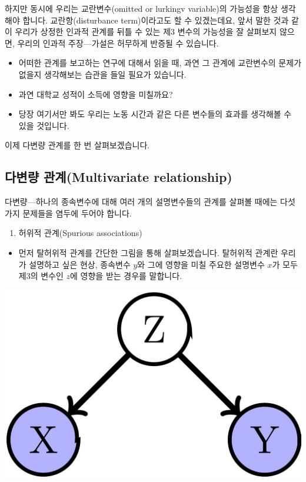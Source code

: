 \documentclass[]{book}
\providecommand{\tightlist}{%
  \setlength{\itemsep}{0pt}\setlength{\parskip}{0pt}}
\begin{document}
하지만 동시에 우리는 교란변수(omitted or lurkingv variable)의 가능성을 항상 생각해야 합니다. 교란항(disturbance term)이라고도 할 수 있겠는데요, 앞서 말한 것과 같이 우리가 상정한 인과적 관계를 뒤틀 수 있는 제3 변수의 가능성을 잘 살펴보지 않으면, 우리의 인과적 주장---가설은 허무하게 반증될 수 있습니다.

\begin{itemize}
\tightlist
\item
  어떠한 관계를 보고하는 연구에 대해서 읽을 때, 과연 그 관계에 교란변수의 문제가 없을지 생각해보는 습관을 들일 필요가 있습니다.
\item
  과연 대학교 성적이 소득에 영향을 미칠까요?
\item
  당장 여기서만 봐도 우리는 노동 시간과 같은 다른 변수들의 효과를 생각해볼 수 있을 것입니다.
\end{itemize}

이제 다변량 관계를 한 번 살펴보겠습니다.

\hypertarget{uxb2e4uxbcc0uxb7c9-uxad00uxacc4multivariate-relationship}{%
\subsection{다변량 관계(Multivariate relationship)}\label{uxb2e4uxbcc0uxb7c9-uxad00uxacc4multivariate-relationship}}

다변량---하나의 종속변수에 대해 여러 개의 설명변수들의 관계를 살펴볼 때에는 다섯 가지 문제들을 염두에 두어야 합니다.

\begin{enumerate}
\def\labelenumi{\arabic{enumi}.}
\tightlist
\item
  허위적 관계(Spurious associations)
\end{enumerate}

\begin{itemize}
\tightlist
\item
  먼저 탈허위적 관계를 간단한 그림을 통해 살펴보겠습니다. 탈허위적 관계란 우리가 설명하고 싶은 현상, 종속변수 \(y\)와 그에 영향을 미칠 주요한 설명변수 \(x\)가 모두 제3의 변수인 \(z\)에 영향을 받는 경우를 말합니다.
\end{itemize}

\begin{center}\includegraphics[width=12.8in]{./Chapters_pdfR/plot/superious} \end{center}
\end{document}
